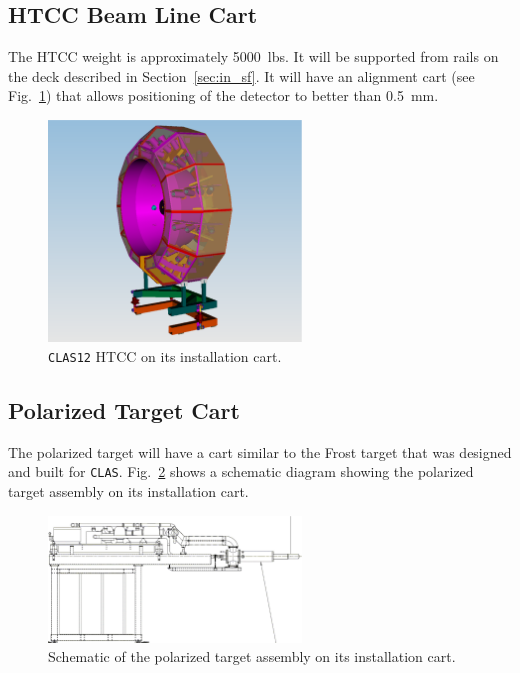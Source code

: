 \subsection{HTCC Beam Line Cart}

The HTCC weight is approximately 5000~lbs.  It will be supported from 
rails on the deck described in Section~\ref{sec:in_sf}.  It will have 
an alignment cart (see Fig.~\ref{htcc_cart}) that allows positioning of 
the detector to better than 0.5~mm. 

\begin{figure}[htbp]
\centering
\includegraphics[width=0.6\textwidth]{htcc_cart.eps}
\caption{\small{{\tt CLAS12} HTCC on its installation cart.
\label{htcc_cart}}}
\end{figure}

\subsection{Polarized Target Cart}

The polarized target will have a cart similar to the Frost target that was 
designed and built for {\tt CLAS}.  Fig.~\ref{poltarget} shows a
schematic diagram showing the polarized target assembly on its installation
cart.

\begin{figure}[htbp]
\centering
\includegraphics[width=0.6\textwidth]{polarizedtarget.eps}
\caption{\small{Schematic of the polarized target assembly on its
installation cart.}}
\label{poltarget}
\end{figure}

